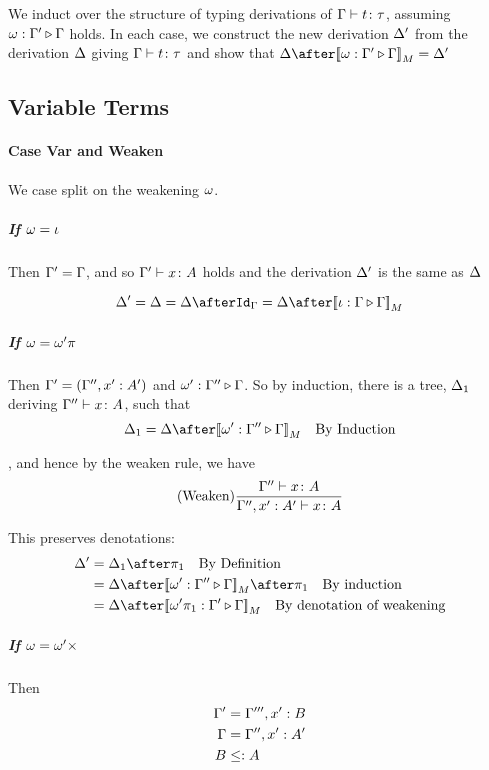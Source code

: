 \documentclass{report}
\begin{document}
We induct over the structure of typing derivations of $\Gamma \vdash t \colon \tau$, assuming $\omega : \Gamma' \triangleright \Gamma$ holds. In each case, we construct the new derivation $\Delta'$ from the derivation $\Delta$ giving $\Gamma \vdash t \colon \tau$ and show that $\D\after\deno{\wrel{\w}{\G'}{\G}} = \D'$

    \subsection{Variable Terms}
    \paragraph{Case Var and Weaken}
        We case split on the weakening $\omega$.
        \subparagraph{If $\omega = \iota$}
        Then $\Gamma' = \Gamma$, and so $\Gamma' \vdash x \colon A$ holds and the derivation $\Delta'$ is the same as $\Delta$

        \begin{equation}
            \D' = \D = \D\after\idg = \D\after\deno{\wrel{\i}{\G}{\G}} 
        \end{equation}
        \subparagraph{If $\omega = \omega'\pi$}
        Then  $\Gamma' = (\Gamma'',x': A')$ and $\omega' : \Gamma'' \triangleright \Gamma$. So by induction, there is a tree, $\Delta_1$ deriving $\Gamma'' \vdash x \colon A$,  such that 
        \begin{equation}
            \D_1 = \D\after\deno{\wrel{\w'}{\G''}{\G}} \qt{By Induction}
        \end{equation}
        
        , and hence by the weaken rule, we have 
        \begin{equation}
            (\text{Weaken}) \frac{\Gamma'' \vdash x \colon A}{\Gamma'', x':A'  \vdash x \colon A}
        \end{equation}

        This preserves denotations:
        \begin{align}
            \D' & = \D_1\after\p\qt{By Definition} \\
            & = \D\after\deno{\wrel{\w'}{\G''}{\G}}\after\p\qt{By induction}\\
            & = \D\after\deno{\wrel{\w'\p}{\G'}{\G}}\qt{By denotation of weakening}
        \end{align}

        \subparagraph{If $\omega = \omega'\times$} 
        Then 
        \begin{align}
            \Gamma' & = \Gamma''', x': B\\
            \Gamma &= \Gamma'', x': A'\\
            B & \leq: A
        \end{align}
\end{document}
